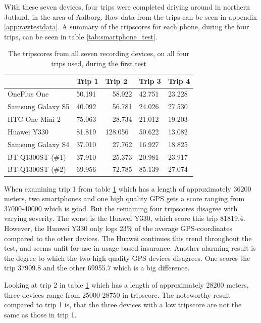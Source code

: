 With these seven devices, four trips were completed driving around in northern Jutland, in the area of Aalborg. Raw data from the trips can be seen in appendix \ref{app:rawtestdata}. A summary of the tripscores for each phone, during the four trips, can be seen in table \ref{tab:smartphone_test}.

\begin{table}[tb]
\centering
\caption{The tripscores from all seven recording devices, on all four trips used, during the first test}
\label{tab:smartphone_test_one}
\begin{tabular}{|l|llll|}
\hline
\rowcolor{tablegreen}

                   & \textbf{Trip 1}    & \textbf{Trip 2}    & \textbf{Trip 3}    & \textbf{Trip 4}  \\\hline
OnePlus One        & 50.191   & \ \  58.922   & 42.751   & 23.228 \\
Samsung Galaxy S5  & 40.092   & \ \ 56.781   & 24.026   & 27.530 \\
HTC One Mini 2     & 75.063   & \ \ 28.734   & 21.012   & 19.203 \\
Huawei Y330        & 81.819   &  128.056   & 50.622   & 13.082 \\
Samsung Galaxy S4  & 37.010   & \ \ 27.762   & 16.927   & 18.825 \\
BT-Q1300ST (\#1)   & 37.910   & \ \ 25.373   & 20.981   & 23.917 \\
BT-Q1300ST (\#2)   & 69.956   & \ \ 72.785   & 85.139   & 27.074 \\\hline

\end{tabular}
\end{table}

When examining trip 1 from table \ref{tab:smartphone_test_one} which has a length of approximately 36200 meters, two smartphones and one high quality GPS gets a score ranging from 37000-40000 which is good. But the remaining four tripscores disagree with varying severity. The worst is the Huawei Y330, which score this trip 81819.4. However, the Huawei Y330 only logs 23\% of the average GPS-coordinates compared to the other devices. The Huawei continues this trend throughout the test, and seems unfit for use in usage based insurance. Another alarming result is the degree to which the two high quality GPS devices disagrees. One scores the trip 37909.8 and the other 69955.7 which is a big difference.

Looking at trip 2 in table \ref{tab:smartphone_test_one} which has a length of approximately 28200 meters, three devices range from 25000-28750 in tripscore. The noteworthy result compared to trip 1 is, that the three devices with a low tripscore are not the same as those in trip 1.

